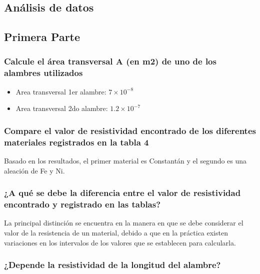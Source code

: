\documentclass[10pt]{article}
\begin{document}
\begin{multicols}{2}
	\section{Análisis de datos}

	\subsection{Primera Parte}

	\subsubsection*{Calcule el área transversal A (en m2)
		de uno de los alambres utilizados}

	\begin{itemize}
		\item Area transversal 1er alambre: $7 \times 10^{-8}$
		\item Area transversal 2do alambre: $1.2 \times 10^{-7}$
	\end{itemize}

	\subsubsection*{Compare el valor de resistividad encontrado de los diferentes materiales
		registrados en la tabla 4}

	Basado en los resultados, el primer material es Constantán y el segundo es
	una aleación de Fe y Ni.

	\subsubsection*{¿A qué se debe la diferencia entre el valor de resistividad encontrado y registrado
		en las tablas?}

	La principal distinción se encuentra en la manera en que se debe considerar
	el valor de la resistencia de un material, debido a que en la práctica
	existen variaciones en los intervalos de los valores que se establecen
	para calcularla.

	\subsubsection*{¿Depende la resistividad de la longitud del alambre?}


\end{multicols}
\end{document}
